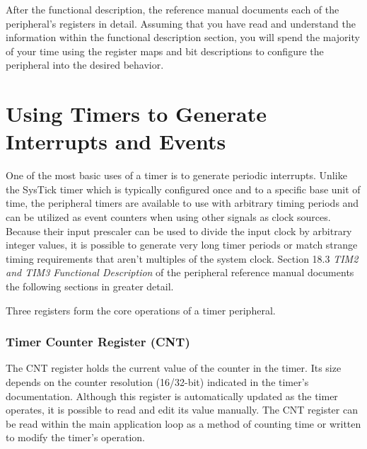 \documentclass[11pt,fleqn]{book} %
\begin{document}
    After the functional description, the reference manual documents each of the peripheral's registers in detail. Assuming that you have read and understand the information within the functional description section, you will spend the majority of your time using the register maps and bit descriptions to configure the peripheral into the desired behavior. 

%    
%    

\section{Using Timers to Generate Interrupts and Events} \label{timer_interrupts}

    One of the most basic uses of a timer is to generate periodic interrupts. Unlike the SysTick timer which is typically configured once and to a specific base unit of time, the peripheral timers are available to use with arbitrary timing periods and can be utilized as event counters when using other signals as clock sources. Because their input prescaler can be used to divide the input clock by arbitrary integer values, it is possible to generate very long timer periods or match strange timing requirements that aren't multiples of the system clock. Section 18.3 \textit{TIM2 and TIM3 Functional Description} of the peripheral reference manual documents the following sections in greater detail. 
    
    Three registers form the core operations of a timer peripheral. 
    \subsubsection{Timer Counter Register (CNT)}
    The CNT register holds the current value of the counter in the timer. Its size depends on the counter resolution (16/32-bit) indicated in the timer's documentation. Although this register is automatically updated as the timer operates, it is possible to read and edit its value manually. The CNT register can be read within the main application loop as a method of counting time or written to modify the timer's operation. 
\end{document}

